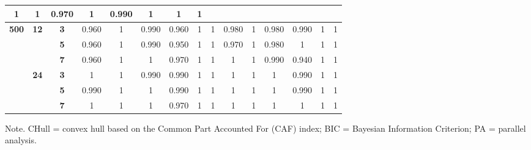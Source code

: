 \documentclass[a4paper,man,natbib]{apa6}
\begin{document}
\begin{table}[]
{\begin{tabular}{ccccccccccccccc}
		1 &
		1 &
		0.970 &
		1 &
		0.990 &
		1 &
		1 &
		1 \\ \hline
		\multirow{6}{*}{\textbf{500}} &
		\multirow{3}{*}{\textbf{12}} &
		\textbf{3} &
		0.960 &
		1 &
		0.990 &
		0.960 &
		1 &
		1 &
		0.980 &
		1 &
		0.980 &
		0.990 &
		1 &
		1 \\ \cline{3-15} 
		&
		&
		\textbf{5} &
		0.960 &
		1 &
		0.990 &
		0.950 &
		1 &
		1 &
		0.970 &
		1 &
		0.980 &
		1 &
		1 &
		1 \\ \cline{3-15} 
		&
		&
		\textbf{7} &
		0.960 &
		1 &
		1 &
		0.970 &
		1 &
		1 &
		1 &
		1 &
		0.990 &
		0.940 &
		1 &
		1 \\ \cline{2-15} 
		&
		\multirow{3}{*}{\textbf{24}} &
		\textbf{3} &
		1 &
		1 &
		0.990 &
		0.990 &
		1 &
		1 &
		1 &
		1 &
		1 &
		0.990 &
		1 &
		1 \\ \cline{3-15} 
		&
		&
		\textbf{5} &
		0.990 &
		1 &
		1 &
		0.990 &
		1 &
		1 &
		1 &
		1 &
		1 &
		0.990 &
		1 &
		1 \\ \cline{3-15} 
		&
		&
		\textbf{7} &
		1 &
		1 &
		1 &
		0.970 &
		1 &
		1 &
		1 &
		1 &
		1 &
		1 &
		1 &
		1 \\ \hline
	\end{tabular}%
}
 \begin{tablenotes}[flushleft]
	\small
	\item 	Note. CHull = convex hull based on the Common Part Accounted For (CAF) index; BIC = Bayesian Information Criterion; PA = parallel analysis.
\end{tablenotes}
\end{table}
\end{document}
